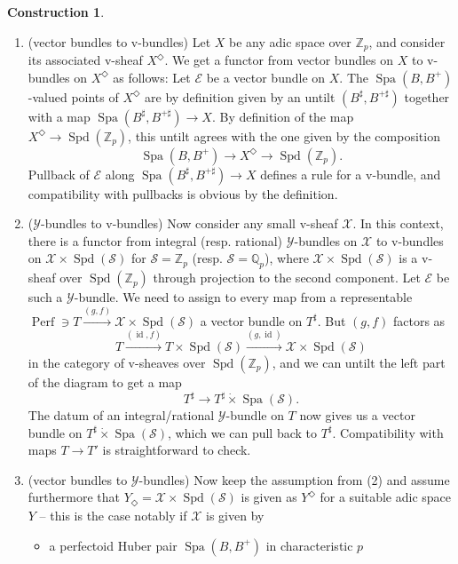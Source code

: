 \documentclass[10pt,twoside]{article}
\numberwithin{equation}{section}
\theoremstyle{plain}
\theoremstyle{definition}
\newtheorem{myconst}[mythm]{Construction}
\DeclareMathOperator{\id}{id}
\DeclareMathOperator{\Spa}{Spa}
\DeclareMathOperator{\Spd}{Spd}
\DeclareMathOperator{\Perf}{Perf}
\newcommand{\ZZ}{\mathbb{Z}}
\newcommand{\QQ}{\mathbb{Q}}
\newcommand{\MCE}{\mathcal{E}}
\newcommand{\MCS}{\mathcal{S}}
\newcommand{\MCX}{\mathcal{X}}
\newcommand{\MCY}{\mathcal{Y}}
\let \diamond \Diamond
\begin{document}
\begin{myconst}\label{baseChangFunctors}
 \begin{enumerate}
    \item (vector bundles to v-bundles) Let \(X\) be any adic space over \(\ZZ_p\), and consider its associated v-sheaf \(X^\diamond\). We get a functor from vector bundles on \(X\) to v-bundles on \(X^\diamond\) as follows: Let \(\MCE\) be a vector bundle on \(X\). The \(\Spa(B,B^+)\)-valued points of \(X^\diamond\) are by definition given by an untilt \((B^{\sharp},B^{+\sharp})\) together with a map \(\Spa(B^{\sharp},B^{+\sharp})\to X\). By definition of the map \(X^\diamond\to\Spd(\ZZ_p)\), this untilt agrees with the one given by the composition
    \[\Spa(B,B^+)\longrightarrow X^\diamond\longrightarrow \Spd(\ZZ_p).\]
    Pullback of \(\MCE\) along \(\Spa(B^\sharp,B^{+\sharp})\to X\) defines a rule for a v-bundle, and compatibility with pullbacks is obvious by the definition.
\item (\(\MCY\)-bundles to v-bundles) Now consider any small v-sheaf \(\MCX\). In this context, there is a functor from integral (resp. rational) \(\MCY\)-bundles on \(\MCX\) to v-bundles on \(\MCX\times\Spd(\MCS)\) for \(\MCS=\ZZ_p\) (resp. \(\MCS=\QQ_p\)), where \(\MCX\times\Spd(\MCS)\) is a v-sheaf over \(\Spd(\ZZ_p)\) through projection to the second component. Let \(\MCE\) be such a \(\MCY\)-bundle. We need to assign to every map from a representable \(\Perf\ni T\xrightarrow{(g,f)} \MCX\times\Spd(\MCS)\) a vector bundle on \(T^\sharp\). But \((g,f)\) factors as
\[T \xrightarrow{(\id,f)} T\times \Spd(\MCS) \xrightarrow {(g,\id)} \MCX\times\Spd(\MCS)\]
in the category of v-sheaves over \(\Spd(\ZZ_p)\), and we can untilt the left part of the diagram to get a map
\[T^\sharp \longrightarrow T^\sharp\dot\times\Spa(\MCS).\]
The datum of an integral/rational \(\MCY\)-bundle on \(T\) now gives us a vector bundle on \(T^\sharp\dot\times\Spa(\MCS)\), which we can pull back to \(T^\sharp\). Compatibility with maps \(T\to T'\) is straightforward to check.
    \item (vector bundles to \(\MCY\)-bundles) Now keep the assumption from (2) and assume furthermore that \(Y_{\diamond}=\MCX\times \Spd(\MCS)\) is given as \(Y^\diamond\) for a suitable adic space \(Y\) -- this is the case notably if \(\MCX\) is given by
    \begin{itemize}
        \item a perfectoid Huber pair \(\Spa(B,B^+)\) in characteristic \(p\)

\end{itemize}
\end{enumerate}
\end{myconst}
\end{document}
